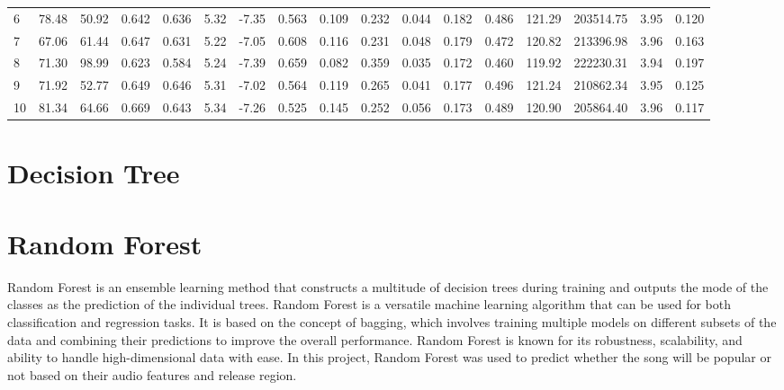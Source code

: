 \begin{itemize}
\begin{table}[ht]
\begin{adjustbox}{width=\textwidth}
\begin{tabular}{lrrrrrrrrrrrrrrrr}
        6  & 78.48 & 50.92 & 0.642 & 0.636 & 5.32 & -7.35 & 0.563 & 0.109 & 0.232 & 0.044 & 0.182 & 0.486 & 121.29 & 203514.75 & 3.95 & 0.120 \\
        7  & 67.06 & 61.44 & 0.647 & 0.631 & 5.22 & -7.05 & 0.608 & 0.116 & 0.231 & 0.048 & 0.179 & 0.472 & 120.82 & 213396.98 & 3.96 & 0.163 \\
        8  & 71.30 & 98.99 & 0.623 & 0.584 & 5.24 & -7.39 & 0.659 & 0.082 & 0.359 & 0.035 & 0.172 & 0.460 & 119.92 & 222230.31 & 3.94 & 0.197 \\
        9  & 71.92 & 52.77 & 0.649 & 0.646 & 5.31 & -7.02 & 0.564 & 0.119 & 0.265 & 0.041 & 0.177 & 0.496 & 121.24 & 210862.34 & 3.95 & 0.125 \\
        10 & 81.34 & 64.66 & 0.669 & 0.643 & 5.34 & -7.26 & 0.525 & 0.145 & 0.252 & 0.056 & 0.173 & 0.489 & 120.90 & 205864.40 & 3.96 & 0.117 \\
        \bottomrule
        \end{tabular}
        \end{adjustbox}
        \end{table}
\end{itemize} 







\section{Decision Tree}




\section{Random Forest}
Random Forest is an ensemble learning method that constructs a multitude of decision trees during
training and outputs the mode of the classes as the prediction of the individual trees. Random Forest
is a versatile machine learning algorithm that can be used for both classification and regression
tasks. It is based on the concept of bagging, which involves training multiple models on different
subsets of the data and combining their predictions to improve the overall performance. Random Forest
is known for its robustness, scalability, and ability to handle high-dimensional data with ease.
In this project, Random Forest was used to predict whether the song will be popular or not based on their audio
features and release region. \\


